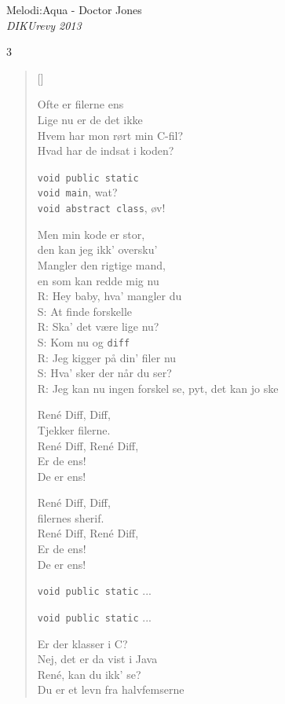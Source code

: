 {Melodi:Aqua - Doctor Jones}\\[.2em]
{\small\itshape DIKUrevy 2013}
\begin{multicols}3
\settowidth{\versewidth}{R: Hey baby, hva' mangler du}
\begin{verse}[\versewidth]

Ofte er filerne ens\\
Lige nu er de det ikke\\
Hvem har mon rørt min C-fil?\\
Hvad har de indsat i koden?

\texttt{void public static}\\
\texttt{void main}, wat?\\
\texttt{void abstract class}, øv!

Men min kode er stor,\\
den kan jeg ikk' oversku'\\
Mangler den rigtige mand,\\
en som kan redde mig nu\\

R: Hey baby, hva' mangler du\\
S: At finde forskelle\\
R: Ska' det være lige nu?\\
S: Kom nu og \texttt{diff}\\
R: Jeg kigger på din' filer nu\\
S: Hva' sker der når du ser?\\
R: Jeg kan nu ingen forskel se, pyt, det kan jo ske

René Diff, Diff,\\
Tjekker filerne.\\
René Diff, René Diff,\\
Er de ens!\\
De er ens!

René Diff, Diff,\\
filernes sherif.\\
René Diff, René Diff,\\
Er de ens!\\
De er ens!

\texttt{void public static} ...

\texttt{void public static} ...

Er der klasser i C?\\
Nej, det er da vist i Java\\
René, kan du ikk' se?\\
Du er et levn fra halvfemserne


\end{verse}
\end{multicols}
